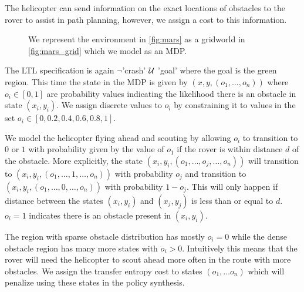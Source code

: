 The helicopter can send information on the exact locations of obstacles to the rover to assist in path planning, however, we assign a cost to this information.

\begin{figure}

\begin{minipage}{5.0cm}
\end{minipage}

\begin{minipage}{5.0cm}
\end{minipage}
\caption{ We represent the environment in \ref{fig:mars} as a gridworld in \ref{fig:mars_grid} which we model as an MDP. 
	}
\end{figure}

The LTL specification is again $\lnot$'crash' $\operatorname{\mathcal{U}}$ 'goal' where the goal is the green region. This time the state in the MDP is given by $(x,y,(o_1,\dots,o_n))$ where $o_i \in [0,1]$ are probability values indicating the likelihood there is an obstacle in state $(x_i,y_i)$. We assign discrete values to $o_i$ by constraining it to values in the set $o_i \in [0,0.2,0.4,0.6,0.8,1]$. 

We model the helicopter flying ahead and scouting by allowing $o_i$ to transition to $0$ or $1$ with probability given by the value of $o_1$ if the rover is within distance $d$ of the obstacle. More explicitly, the state $(x_i,y_i,(o_1,\dots,o_j,\dots,o_n))$ will transition to $(x_i,y_i,(o_1,\dots,1,\dots,o_n))$ with probability $o_j$ and transition to $(x_i,y_i,(o_1,\dots,0,\dots,o_n))$ with probability $1 - o_j$. This will only happen if distance between the states $(x_i,y_i)$ and $(x_j,y_j)$ is less than or equal to $d$. $o_i = 1$ indicates there is an obstacle present in $(x_i,y_i)$. 

The region with sparse obstacle distribution has mostly $o_i = 0$ while the dense obstacle region has many more states with $o_i > 0$. Intuitively this means that the rover will need the helicopter to scout ahead more often in the route with more obstacles. We assign the transfer entropy cost to states $(o_1,\dots o_n)$ which will penalize using these states in the policy synthesis.

